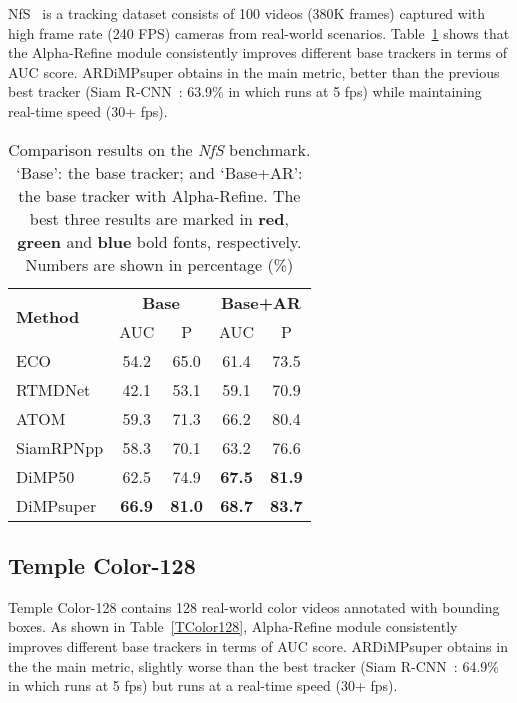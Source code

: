 \documentclass[final]{cvpr}
\begin{document}
{\begin{appendices}
NfS~\cite{NFS} is a tracking dataset consists of 100 videos (380K frames) captured with high frame rate (240 FPS) cameras from real-world scenarios. Table~\ref{NfS} shows that the Alpha-Refine module consistently improves different base trackers in terms of AUC score. ARDiMPsuper obtains  in the main  metric, better than the previous best tracker (Siam R-CNN~\cite{SiamRCNN}: 63.9\% in  which runs at 5 fps) while maintaining real-time speed (30+ fps). 

\begin{table}[htbp]
\caption{Comparison results on the \textit{NfS} benchmark. 
    `Base': the base tracker; and `Base+AR': the base tracker with Alpha-Refine. 
    The best three results are marked in \textbf{\textcolor[rgb]{1,0,0}{red}}, \textbf{\textcolor[rgb]{0,1,0}{green}} and \textbf{\textcolor[rgb]{0,0,1}{blue}} bold fonts, respectively. Numbers are shown in percentage (\%)  \label{NfS}}
\begin{center}
\begin{tabular}{l|c|c|c|c}
\hline
\multirow{2}{*}{\textbf{Method}}  &\multicolumn{2}{c|}{\textbf{Base}}   &\multicolumn{2}{c}{\textbf{Base+AR}} \\
\cline{2-5}
    	     &AUC   &P 	    &AUC   &P 	 \\
\hline
ECO         &54.2 &65.0 &61.4 &73.5 \\
RTMDNet     &42.1 &53.1 &59.1 &70.9 \\
ATOM        &59.3 &71.3 &66.2 &80.4 \\
SiamRPNpp   &58.3 &70.1 &63.2 &76.6 \\
DiMP50      &62.5 &74.9 &\textbf{\textcolor[rgb]{0,1,0}{67.5}} &\textbf{\textcolor[rgb]{0,1,0}{81.9}} \\
DiMPsuper   &\textbf{\textcolor[rgb]{0,0,1}{66.9}} &\textbf{\textcolor[rgb]{0,0,1}{81.0}} &\textbf{\textcolor[rgb]{1,0,0}{68.7}} &\textbf{\textcolor[rgb]{1,0,0}{83.7}} \\

\hline
\end{tabular}
\end{center}
\vspace{-6mm}
\end{table}



\subsection{Temple Color-128}
Temple Color-128\cite{TC128} contains 128 real-world color videos annotated with bounding boxes. As shown in Table~\ref{TColor128}, Alpha-Refine module consistently improves different base trackers in terms of AUC score. ARDiMPsuper obtains  in the the main  metric, slightly worse than the best tracker (Siam R-CNN~\cite{SiamRCNN}: 64.9\% in  which runs at 5 fps) but runs at a real-time speed (30+ fps). 


\end{appendices}}
\end{document}
